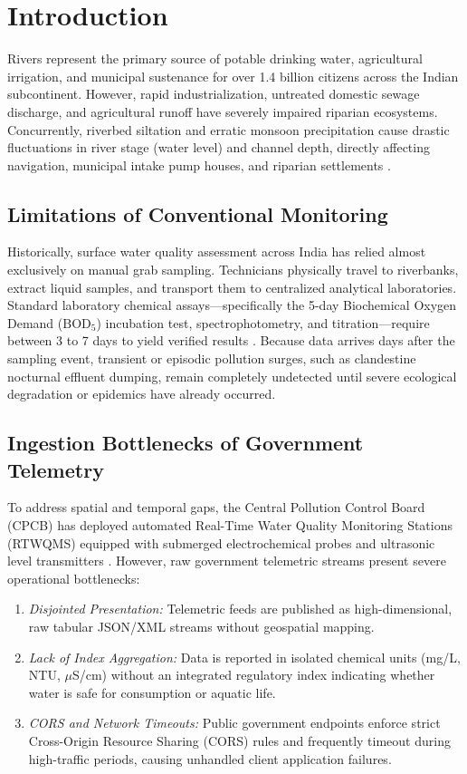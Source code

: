 \documentclass[conference]{IEEEtran}
\begin{document}
\section{Introduction}
Rivers represent the primary source of potable drinking water, agricultural irrigation, and municipal sustenance for over 1.4 billion citizens across the Indian subcontinent. However, rapid industrialization, untreated domestic sewage discharge, and agricultural runoff have severely impaired riparian ecosystems. Concurrently, riverbed siltation and erratic monsoon precipitation cause drastic fluctuations in river stage (water level) and channel depth, directly affecting navigation, municipal intake pump houses, and riparian settlements \cite{cpcb2022}.

\subsection{Limitations of Conventional Monitoring}
Historically, surface water quality assessment across India has relied almost exclusively on manual grab sampling. Technicians physically travel to riverbanks, extract liquid samples, and transport them to centralized analytical laboratories. Standard laboratory chemical assays—specifically the 5-day Biochemical Oxygen Demand ($\text{BOD}_5$) incubation test, spectrophotometry, and titration—require between 3 to 7 days to yield verified results \cite{apha2017}. Because data arrives days after the sampling event, transient or episodic pollution surges, such as clandestine nocturnal effluent dumping, remain completely undetected until severe ecological degradation or epidemics have already occurred.

\subsection{Ingestion Bottlenecks of Government Telemetry}
To address spatial and temporal gaps, the Central Pollution Control Board (CPCB) has deployed automated Real-Time Water Quality Monitoring Stations (RTWQMS) equipped with submerged electrochemical probes and ultrasonic level transmitters \cite{nmcg2023}. However, raw government telemetric streams present severe operational bottlenecks:
\begin{enumerate}
    \item \textit{Disjointed Presentation:} Telemetric feeds are published as high-dimensional, raw tabular JSON/XML streams without geospatial mapping.
    \item \textit{Lack of Index Aggregation:} Data is reported in isolated chemical units (mg/L, NTU, $\mu$S/cm) without an integrated regulatory index indicating whether water is safe for consumption or aquatic life.
    \item \textit{CORS and Network Timeouts:} Public government endpoints enforce strict Cross-Origin Resource Sharing (CORS) rules and frequently timeout during high-traffic periods, causing unhandled client application failures.
\end{enumerate}
\end{document}
